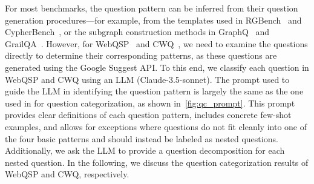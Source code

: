 \begin{table}[ht]
\centering
\caption{Number of questions of each question pattern in WebQSP, CWQ and WIKIQA.}
\label{tab:benchmark_question_pattern}
\end{table}

For most benchmarks, the question pattern can be inferred from their question generation procedures—for example, from the templates used in RGBench~\cite{graphcot} and CypherBench~\cite{cypherbench}, or the subgraph construction methods in GraphQ~\cite{graphq} and GrailQA~\cite{grailqa}. However, for WebQSP~\cite{webqsp} and CWQ~\cite{cwq}, we need to examine the questions directly to determine their corresponding patterns, as these questions are generated using the Google Suggest API. To this end, we classify each question in WebQSP and CWQ using an LLM (Claude-3.5-sonnet). The prompt used to guide the LLM in identifying the question pattern is largely the same as the one used in \name{} for question categorization, as shown in~\autoref{fig:qc_prompt}. This prompt provides clear definitions of each question pattern, includes concrete few-shot examples, and allows for exceptions where questions do not fit cleanly into one of the four basic patterns and should instead be labeled as nested questions. Additionally, we ask the LLM to provide a question decomposition for each nested question. In the following, we discuss the question categorization results of WebQSP and CWQ, respectively.

